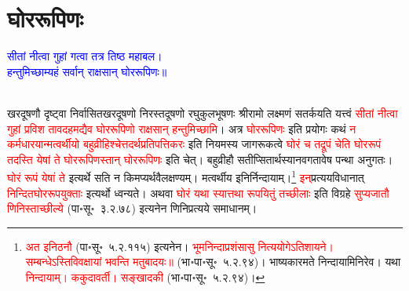 \section[घोर\-रूपिणः]{घोर\-रूपिणः}
\label{sec:ghorarupinah}
\centering\textcolor{blue}{सीतां नीत्वा गुहां गत्वा तत्र तिष्ठ महाबल।\nopagebreak\\
हन्तुमिच्छाम्यहं सर्वान् राक्षसान् घोररूपिणः॥}\nopagebreak\\
\\
\begin{sloppypar}\justifying\noindent\hspace{10mm} खर\-दूषणौ दृष्ट्वा निर्वासित\-खर\-दूषणो निरस्त\-दूषणो रघु\-कुल\-भूषणः श्रीरामो लक्ष्मणं सतर्कयति यत्त्वं \textcolor{red}{सीतां नीत्वा गुहां प्रविश तावदहमद्यैव घोर\-रूपिणो राक्षसान् हन्तुमिच्छामि}। अत्र \textcolor{red}{घोर\-रूपिणः} इति प्रयोगः कथं \textcolor{red}{न कर्मधारयान्मत्वर्थीयो बहुव्रीहिश्चेत्तदर्थ\-प्रतिपत्तिकरः} इति नियमस्य जागरूकत्वे \textcolor{red}{घोरं च तद्रूपं चेति घोर\-रूपं तदस्ति येषां ते घोर\-रूपिणस्तान् घोर\-रूपिणः} इति चेत्। बहुव्रीहौ सतीप्सितार्थस्यानव\-गतावेष पन्था अनुगतः। \textcolor{red}{घोरं रूपं येषां ते} इत्यर्थे सति न किमप्यर्थ\-वैलक्षण्यम्। मत्वर्थीय इनिर्निन्दायाम्।\footnote{\textcolor{red}{अत इनिठनौ} (पा॰सू॰~५.२.११५) इत्यनेन। \textcolor{red}{भूम\-निन्दा\-प्रशंसासु नित्ययोगेऽति\-शायने। सम्बन्धेऽस्ति\-विवक्षायां भवन्ति मतुबादयः॥} (भा॰पा॰सू॰~५.२.९४)। भाष्यकार\-मते निन्दायामिनिरेव। यथा \textcolor{red}{निन्दायाम्। ककुदावर्ती। सङ्खादकी} (भा॰पा॰सू॰~५.२.९४)।} \textcolor{red}{इन्‌}\-प्रत्यय\-विधानात् \textcolor{red}{निन्दित\-घोर\-रूप\-युक्ताः} इत्यर्थो ध्वन्यते। अथवा \textcolor{red}{घोरं यथा स्यात्तथा रूपयितुं तच्छीलाः} इति विग्रहे \textcolor{red}{सुप्यजातौ णिनिस्ताच्छील्ये} (पा॰सू॰~३.२.७८) इत्यनेन णिनि\-प्रत्यये समाधानम्।\end{sloppypar}
